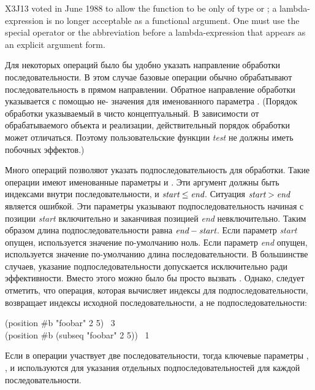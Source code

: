 \begin{newer}
X3J13 voted in June 1988  to allow the  function
to be only of type  or ; a lambda-expression
is no longer acceptable as a functional argument.  One must use the
 special operator or the abbreviation  before
a lambda-expression that appears as an  explicit argument form.
\end{newer}

Для некоторых операций было бы удобно указать направление обработки
последовательности. В этом случае базовые операции обычно обрабатывают
последовательность в прямом направлении. Обратное направление обработки
указывается с помощью не-{\false} значения для именованного параметра
. (Порядок обработки указываемый в  чисто
концептуальный. В зависимости от обрабатываемого объекта и реализации,
действительный порядок обработки может отличаться. Поэтому пользовательские
функции \emph{test} не должны иметь побочных эффектов.)

Много операций позволяют указать подпоследовательность для обработки. Такие
операции имеют именованные параметры  и . Эти аргумент
должны быть индексами внутри последовательности, и
$\emph{start}\leq\emph{end}$. Ситуация $\emph{start}>\emph{end}$ является
ошибкой. Эти параметры указывают подпоследовательность начиная с позиции \emph{start}
включительно и заканчивая позицией \emph{end} невключительно. Таким образом
длина подпоследовательности равна $\emph{end}-\emph{start}$. Если параметр
\emph{start} опущен, используется значение по-умолчанию ноль. Если параметр
\emph{end} опущен, используется значение по-умолчанию длина последовательности.
В большинстве случаев, указание подпоследовательности допускается исключительно
ради эффективности. Вместо этого можно было бы просто вызвать
. Однако, следует отметить, что операция, которая вычисляет индексы
для подпоследовательности, возвращает индексы исходной последовательности, а не
подпоследовательности:
\begin{lisp}
(position \#{\Xbackslash}b "foobar"  2  5) \EV\ 3 \\
(position \#{\Xbackslash}b (subseq "foobar" 2 5)) \EV\ 1
\end{lisp}
Если в операции участвует две последовательности, тогда ключевые параметры
, ,  и  используются для указания
отдельных подпоследовательностей для каждой последовательности.

